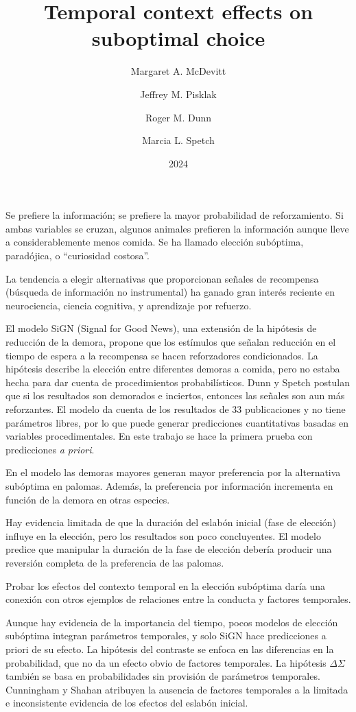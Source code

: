 \documentclass[a4paper,12pt]{article}
\title{Temporal context effects on suboptimal choice}
\author{Margaret A. McDevitt \and Jeffrey M. Pisklak \and Roger M. Dunn \and Marcia L. Spetch}
\date{2024}
\begin{document}
{\scshape\bfseries \maketitle}

Se prefiere la información; se prefiere la mayor probabilidad de reforzamiento.
Si ambas variables se cruzan, algunos animales prefieren la información aunque lleve a considerablemente menos comida.
Se ha llamado elección subóptima, paradójica, o ``curiosidad costosa''.

La tendencia a elegir alternativas que proporcionan señales de recompensa (búsqueda de información no instrumental) ha ganado gran interés reciente en neurociencia, ciencia cognitiva, y aprendizaje por refuerzo.

El modelo SiGN (Signal for Good News), una extensión de la hipótesis de reducción de la demora, propone que los estímulos que señalan reducción en el tiempo de espera a la recompensa se hacen reforzadores condicionados.
La hipótesis describe la elección entre diferentes demoras a comida, pero no estaba hecha para dar cuenta de procedimientos probabilísticos.
Dunn y Spetch postulan que si los resultados son demorados e inciertos, entonces las señales son aun más reforzantes.
El modelo da cuenta de los resultados de 33 publicaciones y no tiene parámetros libres, por lo que puede generar predicciones cuantitativas basadas en variables procedimentales.
En este trabajo se hace la primera prueba con predicciones {\itshape a priori}.

En el modelo las demoras mayores generan mayor preferencia por la alternativa subóptima en palomas.
Además, la preferencia por información incrementa en función de la demora en otras especies.

Hay evidencia limitada de que la duración del eslabón inicial (fase de elección) influye en la elección, pero los resultados son poco concluyentes.
El modelo predice que manipular la duración de la fase de elección debería producir una reversión completa de la preferencia de las palomas.

Probar los efectos del contexto temporal en la elección subóptima daría una conexión con otros ejemplos de relaciones entre la conducta y factores temporales.

Aunque hay evidencia de la importancia del tiempo, pocos modelos de elección subóptima integran parámetros temporales, y solo SiGN hace predicciones a priori de su efecto.
La hipótesis del contraste se enfoca en las diferencias en la probabilidad, que no da un efecto obvio de factores temporales.
La hipótesis $\Delta\Sigma$ también se basa en probabilidades sin provisión de parámetros temporales.
Cunningham y Shahan atribuyen la ausencia de factores temporales a la limitada e inconsistente evidencia de los efectos del eslabón inicial.
\end{document}
